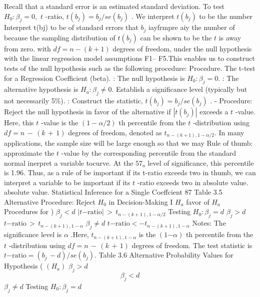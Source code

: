 \documentclass[11pt]{article}
\begin{document}
Recall that a standard error is an estimated standard deviation. To test \(H_{0} : \beta_{j}=0 ,\)
\(t\) -ratio, \(t ( b_{j} )=b_{j} / s e ( b_{j} )\) . We interpret \(t ( b_{j} )\) to be the number
Interpret t(bj) to be of standard errors that \(b_{j}\) iayfrmpre aiy
the number of because the sampling distribution of \(t ( b_{j} )\) can be shown to be the \(t\)
 is away from zero. with \(d f=n-( k+1 )\) degrees of freedom, under the null hypothesis with the
 linear regression model assumptions F1-- F5.This enables us to construct tests of
 the null hypothesis such as the following procedure:
Procedure. The t-test for a Regression Coefficient (beta).
: The null hypothesis is \(H_{0} : \beta_{j}=0 .\)
: The alternative hypothesis is \(H_{a} : \beta_{j} \neq0 .\)
Establish a significance level  (typically but not necessarily 5\%).
: Construct the statistic, \(t ( b_{j} )=b_{j} / s e ( b_{j} )\) .
- Procedure: Reject the null hypothesis in favor of the alternative if \(| t ( b_{j} ) |\)
exceeds a \(t\) -value. Here, this \(t\) -value is the \(( 1-\alpha/ 2 )\) th percentile from
the \(t\) -distribution using \(d f=n \,-\, ( k \,+\, 1 )\) degrees of freedom, denoted as
\(t_{n-( k+1 ) , 1-\alpha/ 2} .\)
In many applications, the sample size will be large enough so that we may
Rule of thumb: approximate the \(t\) -value by the corresponding percentile from the standard normal
inerpret a variable tocurve. At the \(5 7_{o}\) level of significance, this percentile is 1.96. Thus, as a rule of
be important if its
t-ratio exceeds two in thumb, we can interpret a variable to be important if its \(t\) -ratio exceeds two in
 absolute value. absolute value.
 Statistical Inference for a Single Coeffcient 87
Table 3.5
Alternative Procedure: Reject \(H_{0}\) in Decision-Making
I \(H_{a}\) favor of \(H_{a}\) Procedures for
)
\(\beta_{j} < d\) \(\vert t \mathrm{-r a t i o} \vert\, > \, t_{n-( k+1 ) , 1-\alpha/ 2}\) Testing \(H_{0} : \beta_{j}=d\)
\(\beta_{j} > d\) \(t \mathrm{-r a t i o} \, > \, t_{n-\left( k+1 \right) , 1-\alpha}\)
\(\beta_{j} \neq d\) \(t \mathrm{-r a t i o} <-{t}_{n-\left( k+1 \right) , 1-\alpha}\)
Notes: The significance level is \(\alpha\) .Here, \(t_{n-( k+1 ) , 1-\alpha}\)
is the \(( 1 \mathrm{-} \alpha)\) th percentile from the \(t\) -distribution
using \(d f=n \,-\, ( k \,+\, 1 )\) degrees of freedom. The test
statistic is \(t \mathrm{-r a t i o}=( b_{j} \,-d ) / s e ( b_{j} ) .\)
Table 3.6
Alternative Probability Values for
Hypothesis ( \(( H_{a} )\) \(\beta_{j} > d\)
\[
\beta_{j} < d
\]
\(\beta_{j} \neq d\) Testing \(H_{0} : \beta_{j}=d\)
\end{document}
